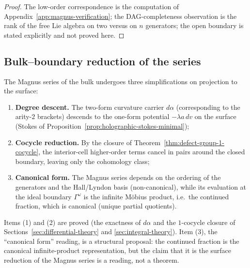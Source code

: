 \begin{proof}
The low-order correspondence is the computation of
Appendix~\ref{app:magnus-verification}; the DAG-completeness observation is the
rank of the free Lie algebra on two versus on $n$ generators; the open
boundary is stated explicitly and not proved here.
\end{proof}

\subsection{Bulk--boundary reduction of the series}

\begin{proposition}
\label{prop:bulk-boundary-series-reduction}
The Magnus series of the bulk undergoes three simplifications on projection to
the surface:
\begin{enumerate}
  \item \textbf{Degree descent.} The two-form curvature carrier $d\alpha$
  (corresponding to the arity-$2$ brackets) descends to the one-form potential
  $-\lambda a\,dv$ on the surface (Stokes of
  Proposition~\ref{prop:holographic-stokes-minimal});
  \item \textbf{Cocycle reduction.} By the closure of
  Theorem~\ref{thm:defect-group-1-cocycle}, the interior-cell higher-order terms
  cancel in pairs around the closed boundary, leaving only the cohomology class;
  \item \textbf{Canonical form.} The Magnus series depends on the ordering of
  the generators and the Hall/Lyndon basis (non-canonical), while its evaluation
  at the ideal boundary $\Gamma^\omega$ is the infinite M\"obius product, i.e.\
  the continued fraction, which is canonical (unique partial quotients).
\end{enumerate}
\end{proposition}

\begin{remark}
\label{rem:bulk-boundary-reduction-status}
Items (1) and (2) are proved (the exactness of $d\alpha$ and the $1$-cocycle
closure of Sections~\ref{sec:differential-theory} and
\ref{sec:integral-theory}).  Item (3), the ``canonical form'' reading, is a
structural proposal: the continued fraction is the canonical infinite-product
representation, but the claim that it is the surface reduction of the Magnus
series is a reading, not a theorem.
\end{remark}

